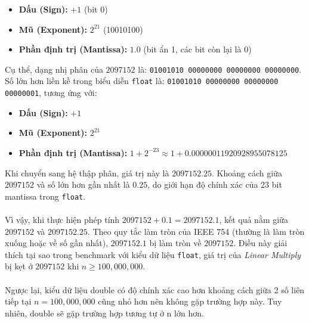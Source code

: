 \begin{itemize}
    \item \textbf{Dấu (Sign):} $+1$ (bit 0)
    \item \textbf{Mũ (Exponent):} $2^{21}$ (10010100)
    \item \textbf{Phần định trị (Mantissa):} $1.0$ (bit ẩn 1, các bit còn lại là 0)
\end{itemize}

Cụ thể, dạng nhị phân của $2097152$ là: \texttt{01001010 00000000 00000000 00000000}.\\
Số lớn hơn liền kề trong biểu diễn \texttt{float} là: \texttt{01001010 00000000 00000000 00000001}, tương ứng với:
\begin{itemize}
    \item \textbf{Dấu (Sign):} $+1$
    \item \textbf{Mũ (Exponent):} $2^{21}$
    \item \textbf{Phần định trị (Mantissa):} $1 + 2^{-23} \approx 1 + 0.00000011920928955078125$
\end{itemize}

Khi chuyển sang hệ thập phân, giá trị này là $2097152.25$. Khoảng cách giữa $2097152$ và số lớn hơn gần nhất là $0.25$, do giới hạn độ chính xác của 23 bit mantissa trong \texttt{float}.\\ \\ 
Vì vậy, khi thực hiện phép tính $2097152 + 0.1 = 2097152.1$, kết quả nằm giữa $2097152$ và $2097152.25$. Theo quy tắc làm tròn của IEEE 754 (thường là làm tròn xuống hoặc về số gần nhất), $2097152.1$ bị làm tròn về $2097152$. Điều này giải thích tại sao trong benchmark với kiểu dữ liệu \texttt{float}, giá trị của \textit{Linear Multiply} bị kẹt ở $2097152$ khi $n \geq 100,000,000$.\\ \\
Ngược lại, kiểu dữ liệu double có độ chính xác cao hơn khoảng cách giữa 2 số liên tiếp tại $n = 100,000,000$ cũng nhỏ hơn nên không gặp trường hợp này. Tuy nhiên, double sẽ gặp trường hợp tương tự ở n lớn hơn.